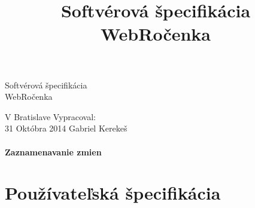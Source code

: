 \documentclass[slovak, 12pt, Times New Roman]{article}
\begin{document}
	\thispagestyle{fancy}
		\begin{center}\huge{Softvérová špecifikácia\\ WebRočenka\par}\end{center}
	\title{Softvérová špecifikácia WebRočenka}
	\date{}

	\begin{minipage}[b]{\textwidth}
	    \vspace{110mm}	 
	    \large   
	    V Bratislave \hspace{90mm} Vypracoval:\\
	    31 Októbra 2014 \hspace{81mm} Gabriel Kerekeš
	    \vspace{-20mm} 
	\end{minipage}
	\clearpage
	\paragraph{Zaznamenavanie zmien}
	\clearpage
	\tableofcontents
	\clearpage
	\section{Používateľská špecifikácia}
\end{document}
